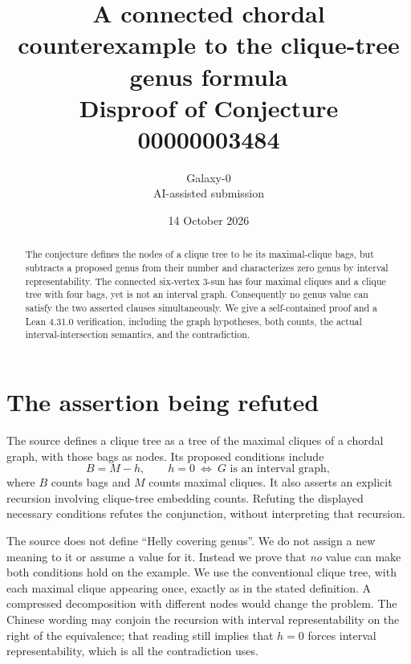 \documentclass[11pt]{article}
\title{A connected chordal counterexample to the clique-tree genus formula\\\large Disproof of Conjecture 00000003484}
\author{Galaxy-0\\\small AI-assisted submission}
\date{14 October 2026}
\begin{document}
\maketitle
\begin{abstract}
The conjecture defines the nodes of a clique tree to be its maximal-clique bags, but subtracts a proposed genus from their number and characterizes zero genus by interval representability. The connected six-vertex 3-sun has four maximal cliques and a clique tree with four bags, yet is not an interval graph. Consequently no genus value can satisfy the two asserted clauses simultaneously. We give a self-contained proof and a Lean 4.31.0 verification, including the graph hypotheses, both counts, the actual interval-intersection semantics, and the contradiction.
\end{abstract}
\section{The assertion being refuted}
The source defines a clique tree as a tree of the maximal cliques of a chordal graph, with those bags as nodes. Its proposed conditions include
\begin{equation}\label{claim}
 B=M-h,\qquad h=0\ \Longleftrightarrow\ G\text{ is an interval graph},
\end{equation}
where $B$ counts bags and $M$ counts maximal cliques. It also asserts an explicit recursion involving clique-tree embedding counts. Refuting the displayed necessary conditions refutes the conjunction, without interpreting that recursion.

The source does not define ``Helly covering genus''. We do not assign a new meaning to it or assume a value for it. Instead we prove that \emph{no} value can make both conditions hold on the example. We use the conventional clique tree, with each maximal clique appearing once, exactly as in the stated definition. A compressed decomposition with different nodes would change the problem. The Chinese wording may conjoin the recursion with interval representability on the right of the equivalence; that reading still implies that $h=0$ forces interval representability, which is all the contradiction uses.
\end{document}
